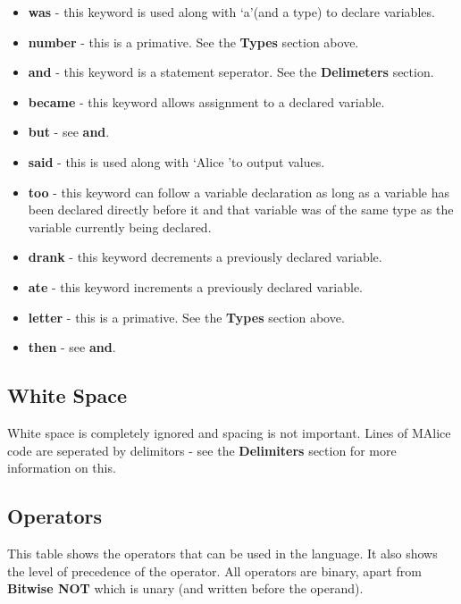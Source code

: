 \documentclass[a4, 11pt]{article}
\begin{document}
\begin{itemize}
  \item \textbf{was} - this keyword is used along with \textquoteleft a\textquoteright (and a type) to declare variables.
  \item \textbf{number} - this is a primative. See the \textbf{Types} section above.
  \item \textbf{and} - this keyword is a statement seperator. See the \textbf{Delimeters} section.
  \item \textbf{became} - this keyword allows assignment to a declared variable.
  \item \textbf{but} - see \textbf{and}.
  \item \textbf{said} - this is used along with \textquoteleft Alice
  \textquoteright to output values.
  \item \textbf{too} - this keyword can follow a variable declaration as long as a variable has been declared directly before it and that variable was of the same type as the variable currently being declared.
  \item \textbf{drank} - this keyword decrements a previously declared variable.
  \item \textbf{ate} - this keyword increments a previously declared variable.
  \item \textbf{letter} - this is a primative. See the \textbf{Types} section above.
  \item \textbf{then} - see \textbf{and}.
\end{itemize}

\subsection*{White Space}
White space is completely ignored and spacing is not important. Lines of MAlice code are seperated by delimitors - see the \textbf{Delimiters} section for more information on this.

\subsection*{Operators}
This table shows the operators that can be used in the language. It also shows the level of precedence of the operator. All operators are binary, apart from \textbf{Bitwise NOT} which is unary (and written before the operand).
\end{document}
